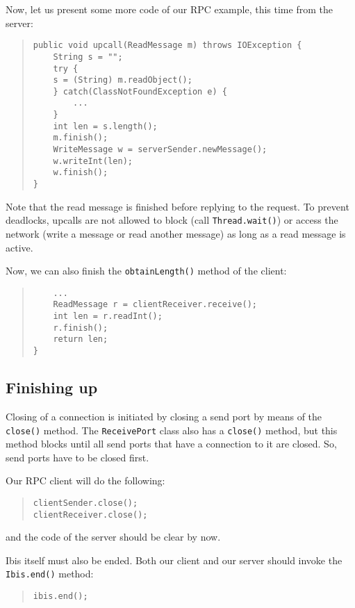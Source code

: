 \documentclass[10pt]{article}
\begin{document}
Now, let us present some more code of our RPC example, this time
from the server:

{\small
\begin{quote}
\begin{verbatim}
public void upcall(ReadMessage m) throws IOException {
    String s = "";
    try {
	s = (String) m.readObject();
    } catch(ClassNotFoundException e) {
        ...
    }
    int len = s.length();
    m.finish();
    WriteMessage w = serverSender.newMessage();
    w.writeInt(len);
    w.finish();
}
\end{verbatim}
\end{quote}
}

\noindent
Note that the read message is finished before replying to the
request. To prevent deadlocks, upcalls are not allowed to block
(call \texttt{Thread.wait()}) or access the network (write a message or
read another message) as long as a read message is active.

Now, we can also finish the \texttt{obtainLength()} method of the client:
{\small
\begin{quote}
\begin{verbatim}
    ...
    ReadMessage r = clientReceiver.receive();
    int len = r.readInt();
    r.finish();
    return len;
}
\end{verbatim}
\end{quote}
}

\subsection{Finishing up}

Closing of a connection is initiated by closing a send port
by means of the \texttt{close()} method. The \texttt{ReceivePort}
class also has a \texttt{close()} method, but this method blocks
until all send ports that have a connection to it are closed.
So, send ports have to be closed first.

Our RPC client will do the following:

{\small
\begin{quote}
\begin{verbatim}
clientSender.close();
clientReceiver.close();
\end{verbatim}
\end{quote}
}
and the code of the server should be clear by now.

Ibis itself must also be ended. Both our client and our server
should invoke the \texttt{Ibis.end()} method:
{\small
\begin{quote}
\begin{verbatim}
ibis.end();
\end{verbatim}
\end{quote}
}
\end{document}
